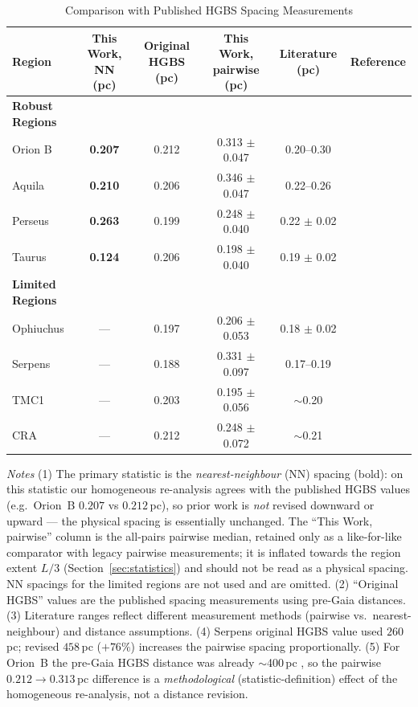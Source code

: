 \documentclass[usenatbib,twoside,twocolumn]{mnras}
\begin{document}
\begin{table}
\caption{Comparison with Published HGBS Spacing Measurements}
\label{tab:literature}
\begin{tabular}{lccccc}
\toprule
Region & This Work, NN (pc) & Original HGBS (pc) & This Work, pairwise (pc) & Literature (pc) & Reference \\
\midrule
\textbf{Robust Regions} &  &  &  &  &  \\
Orion B & \textbf{0.207} & 0.212 & 0.313 $\pm$ 0.047 & 0.20--0.30 & \citet{Konyves2020} \\
Aquila  & \textbf{0.210} & 0.206 & 0.346 $\pm$ 0.047 & 0.22--0.26 & \citet{Konyves2015} \\
Perseus & \textbf{0.263} & 0.199 & 0.248 $\pm$ 0.040 & 0.22 $\pm$ 0.02 & \citet{Pezzuto2021} \\
Taurus  & \textbf{0.124} & 0.206 & 0.198 $\pm$ 0.040 & 0.19 $\pm$ 0.02 & \citet{Hacar2013} \\
\midrule
\textbf{Limited Regions} &  &  &  &  &  \\
Ophiuchus & --- & 0.197 & 0.206 $\pm$ 0.053 & 0.18 $\pm$ 0.02 & \citet{Konyves2020} \\
Serpens  & --- & 0.188 & 0.331 $\pm$ 0.097 & 0.17--0.19 & \citet{Konyves2020} \\
TMC1     & --- & 0.203 & 0.195 $\pm$ 0.056 & $\sim$0.20 & \citet{Hacar2013} \\
CRA      & --- & 0.212 & 0.248 $\pm$ 0.072 & $\sim$0.21 & \citet{Konyves2020} \\
\bottomrule
\end{tabular}

\vspace{0.1in}
\footnotesize
\emph{Notes} (1) The primary statistic is the \emph{nearest-neighbour} (NN) spacing (bold): on this statistic our homogeneous re-analysis agrees with the published HGBS values (e.g.\ Orion~B $0.207$ vs $0.212$\,pc), so prior work is \emph{not} revised downward or upward --- the physical spacing is essentially unchanged. The ``This Work, pairwise'' column is the all-pairs pairwise median, retained only as a like-for-like comparator with legacy pairwise measurements; it is inflated towards the region extent $L/3$ (Section~\ref{sec:statistics}) and should not be read as a physical spacing. NN spacings for the limited regions are not used and are omitted. (2) ``Original HGBS'' values are the published spacing measurements using pre-Gaia distances. (3) Literature ranges reflect different measurement methods (pairwise vs.\ nearest-neighbour) and distance assumptions. (4) Serpens original HGBS value used $260$\,pc; revised $458$\,pc ($+76\%$) increases the pairwise spacing proportionally. (5) For Orion~B the pre-Gaia HGBS distance was already $\sim$400\,pc \citep{Konyves2020}, so the pairwise $0.212\to0.313$\,pc difference is a \emph{methodological} (statistic-definition) effect of the homogeneous re-analysis, not a distance revision.
\end{table}
\end{document}
